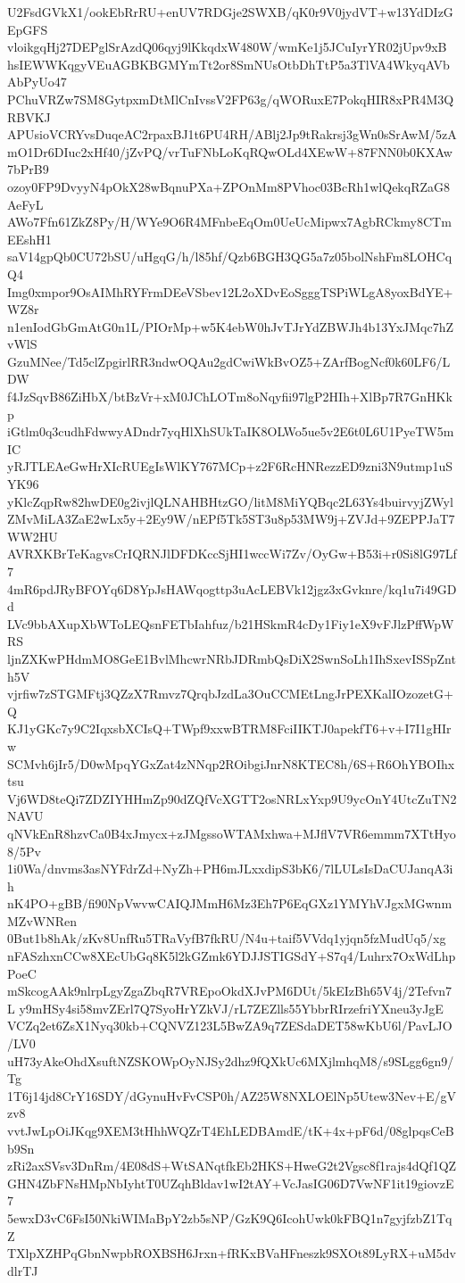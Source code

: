 U2FsdGVkX1/ookEbRrRU+enUV7RDGje2SWXB/qK0r9V0jydVT+w13YdDIzGEpGFS
vloikgqHj27DEPglSrAzdQ06qyj9lKkqdxW480W/wmKe1j5JCuIyrYR02jUpv9xB
hsIEWWKqgyVEuAGBKBGMYmTt2or8SmNUsOtbDhTtP5a3TlVA4WkyqAVbAbPyUo47
PChuVRZw7SM8GytpxmDtMlCnIvssV2FP63g/qWORuxE7PokqHIR8xPR4M3QRBVKJ
APUsioVCRYvsDuqeAC2rpaxBJ1t6PU4RH/ABlj2Jp9tRakrsj3gWn0sSrAwM/5zA
mO1Dr6DIuc2xHf40/jZvPQ/vrTuFNbLoKqRQwOLd4XEwW+87FNN0b0KXAw7bPrB9
ozoy0FP9DvyyN4pOkX28wBqnuPXa+ZPOnMm8PVhoc03BcRh1wlQekqRZaG8AeFyL
AWo7Ffn61ZkZ8Py/H/WYe9O6R4MFnbeEqOm0UeUcMipwx7AgbRCkmy8CTmEEshH1
saV14gpQb0CU72bSU/uHgqG/h/l85hf/Qzb6BGH3QG5a7z05bolNshFm8LOHCqQ4
Img0xmpor9OsAIMhRYFrmDEeVSbev12L2oXDvEoSgggTSPiWLgA8yoxBdYE+WZ8r
n1enIodGbGmAtG0n1L/PIOrMp+w5K4ebW0hJvTJrYdZBWJh4b13YxJMqc7hZvWlS
GzuMNee/Td5clZpgirlRR3ndwOQAu2gdCwiWkBvOZ5+ZArfBogNcf0k60LF6/LDW
f4JzSqvB86ZiHbX/btBzVr+xM0JChLOTm8oNqyfii97lgP2HIh+XlBp7R7GnHKkp
iGtlm0q3cudhFdwwyADndr7yqHlXhSUkTaIK8OLWo5ue5v2E6t0L6U1PyeTW5mIC
yRJTLEAeGwHrXIcRUEgIsWlKY767MCp+z2F6RcHNRezzED9zni3N9utmp1uSYK96
yKlcZqpRw82hwDE0g2ivjlQLNAHBHtzGO/litM8MiYQBqc2L63Ys4buirvyjZWyl
ZMvMiLA3ZaE2wLx5y+2Ey9W/nEPf5Tk5ST3u8p53MW9j+ZVJd+9ZEPPJaT7WW2HU
AVRXKBrTeKagvsCrIQRNJlDFDKccSjHI1wccWi7Zv/OyGw+B53i+r0Si8lG97Lf7
4mR6pdJRyBFOYq6D8YpJsHAWqogttp3uAcLEBVk12jgz3xGvknre/kq1u7i49GDd
LVc9bbAXupXbWToLEQsnFETbIahfuz/b21HSkmR4cDy1Fiy1eX9vFJlzPffWpWRS
ljnZXKwPHdmMO8GeE1BvlMhcwrNRbJDRmbQsDiX2SwnSoLh1IhSxevISSpZnth5V
vjrfiw7zSTGMFtj3QZzX7Rmvz7QrqbJzdLa3OuCCMEtLngJrPEXKalIOzozetG+Q
KJ1yGKc7y9C2IqxsbXCIsQ+TWpf9xxwBTRM8FciIIKTJ0apekfT6+v+I7I1gHIrw
SCMvh6jIr5/D0wMpqYGxZat4zNNqp2ROibgiJnrN8KTEC8h/6S+R6OhYBOIhxtsu
Vj6WD8teQi7ZDZIYHHmZp90dZQfVcXGTT2osNRLxYxp9U9ycOnY4UtcZuTN2NAVU
qNVkEnR8hzvCa0B4xJmycx+zJMgssoWTAMxhwa+MJflV7VR6emmm7XTtHyo8/5Pv
1i0Wa/dnvms3asNYFdrZd+NyZh+PH6mJLxxdipS3bK6/7lLULsIsDaCUJanqA3ih
nK4PO+gBB/fi90NpVwvwCAIQJMmH6Mz3Eh7P6EqGXz1YMYhVJgxMGwnmMZvWNRen
0But1b8hAk/zKv8UnfRu5TRaVyfB7fkRU/N4u+taif5VVdq1yjqn5fzMudUq5/xg
nFASzhxnCCw8XEcUbGq8K5l2kGZmk6YDJJSTIGSdY+S7q4/Luhrx7OxWdLhpPoeC
mSkcogAAk9nlrpLgyZgaZbqR7VREpoOkdXJvPM6DUt/5kEIzBh65V4j/2Tefvn7L
y9mHSy4si58mvZErl7Q7SyoHrYZkVJ/rL7ZEZlls55YbbrRIrzefriYXneu3yJgE
VCZq2et6ZsX1Nyq30kb+CQNVZ123L5BwZA9q7ZESdaDET58wKbU6l/PavLJO/LV0
uH73yAkeOhdXsuftNZSKOWpOyNJSy2dhz9fQXkUc6MXjlmhqM8/s9SLgg6gn9/Tg
1T6j14jd8CrY16SDY/dGynuHvFvCSP0h/AZ25W8NXLOElNp5Utew3Nev+E/gVzv8
vvtJwLpOiJKqg9XEM3tHhhWQZrT4EhLEDBAmdE/tK+4x+pF6d/08glpqsCeBb9Sn
zRi2axSVsv3DnRm/4E08dS+WtSANqtfkEb2HKS+HweG2t2Vgsc8f1rajs4dQf1QZ
GHN4ZbFNsHMpNbIyhtT0UZqhBldav1wI2tAY+VcJasIG06D7VwNF1it19giovzE7
5ewxD3vC6FsI50NkiWIMaBpY2zb5sNP/GzK9Q6IcohUwk0kFBQ1n7gyjfzbZ1TqZ
TXlpXZHPqGbnNwpbROXBSH6Jrxn+fRKxBVaHFneszk9SXOt89LyRX+uM5dvdlrTJ
